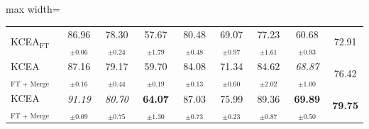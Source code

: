 \begin{adjustbox}{max width=\textwidth}
\begin{tabular}{l c c c c c c c c}
\midrule
KCEA$_{\text{FT}}$ & 86.96$_{\pm 0.06}$ & 78.30$_{\pm 0.24}$ & 57.67$_{\pm 1.79}$ & 80.48$_{\pm 0.48}$ & 69.07$_{\pm 0.97}$ & 77.23$_{\pm 1.61}$ & 60.68$_{\pm 0.93}$ & 72.91 \\
KCEA$_{\text{FT + Merge}}$ & 87.16$_{\pm 0.16}$ & 79.17$_{\pm 0.44}$ & 59.70$_{\pm 0.19}$ & 84.08$_{\pm 0.13}$ & 71.34$_{\pm 0.60}$ & 84.62$_{\pm 2.02}$ & \textit{68.87}$_{\pm 1.00}$ & 76.42 \\
KCEA$_{\text{FT + Merge + Align}}$ & \textit{91.19}$_{\pm 0.09}$ & \textit{80.70}$_{\pm 0.75}$ & \textbf{64.07}$_{\pm 1.30}$ & 87.03$_{\pm 0.73}$ & 75.99$_{\pm 0.23}$ & 89.36$_{\pm 0.87}$ & \textbf{69.89}$_{\pm 0.50}$ & \textbf{79.75} \\
\bottomrule
\end{tabular}
\end{adjustbox}